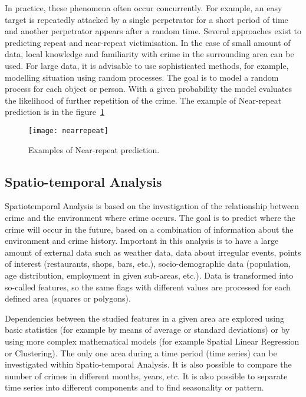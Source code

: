 \documentclass[thesis=M,english]{FITthesis}[2012/10/20]
\begin{document}
In practice, these phenomena often occur concurrently. For example, an easy target is repeatedly attacked by a single perpetrator for a short period of time and another perpetrator appears after a random time. Several approaches exist to predicting repeat and near-repeat victimisation.\cite{Short2009repeat} In the case of small amount of data, local knowledge and familiarity with crime in the surrounding area can be used. For large data, it is advisable to use sophisticated methods, for example, modelling situation using random processes. The goal is to model a random process for each object or person. With a given probability the model evaluates the likelihood of further repetition of the crime. The example of Near-repeat prediction is in the figure~\ref{fig:nearrepeat}

\begin{figure}[ht]\centering
    \texttt{[image: nearrepeat]}
    \caption{Examples of Near-repeat prediction.\cite{nearepeat_image}}\label{fig:nearrepeat}
\end{figure}

\subsection{Spatio-temporal Analysis}

Spatiotemporal Analysis is based on the investigation of the relationship between crime and the environment where crime occurs. The goal is to predict where the crime will occur in the future, based on a combination of information about the environment and crime history. Important in this analysis is to have a large amount of external data such as weather data, data about irregular events, points of interest (restaurants, shops, bars, etc.), socio-demographic data (population, age distribution, employment in given sub-areas, etc.). Data is transformed into so-called features, so the same flags with different values are processed for each defined area (squares or polygons).\cite[44--45]{PP13}

Dependencies between the studied features in a given area are explored using basic statistics (for example by means of average or standard deviations) or by using more complex mathematical models (for example Spatial Linear Regression or Clustering). The only one area during a time period (time series) can be investigated within Spatio-temporal Analysis. It is also possible to compare the number of crimes in different months, years, etc. It is also possible to separate time series into different components and to find seasonality or pattern.\cite[48--49]{PP13}
\end{document}

